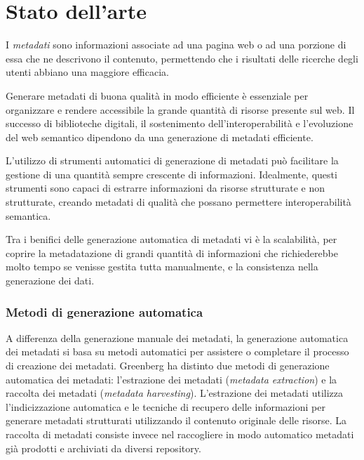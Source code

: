 \clearpage{\pagestyle{empty}\cleardoublepage}
\lhead[\fancyplain{}{\bfseries\thepage}]{\fancyplain{}{\bfseries\rightmark}}
\chapter{Stato dell'arte}

I \textit{metadati} sono informazioni associate ad una pagina web o ad una porzione di essa che ne descrivono il contenuto, permettendo che i risultati delle ricerche degli utenti abbiano una maggiore efficacia.

Generare metadati di buona qualità in modo efficiente è essenziale per organizzare e rendere accessibile la grande quantità di risorse presente sul web. Il successo di biblioteche digitali, il sostenimento dell'interoperabilità e l'evoluzione del web semantico dipendono da una generazione di metadati efficiente\cite{metadata}.

\vspace{5mm}

L'utilizzo di strumenti automatici di generazione di metadati può facilitare la gestione di una quantità sempre crescente di informazioni.
Idealmente, questi strumenti sono capaci di estrarre informazioni da risorse strutturate e non strutturate, creando metadati di qualità che possano permettere interoperabilità semantica.

\vspace{5mm}

Tra i benifici delle generazione automatica di metadati vi è la scalabilità, per coprire la metadatazione di grandi quantità di informazioni che richiederebbe molto tempo se venisse gestita tutta manualmente, e la consistenza nella generazione dei dati.

\subsection{Metodi di generazione automatica}

A differenza della generazione manuale dei metadati, la generazione automatica dei metadati si basa su metodi automatici per assistere o completare il processo di creazione dei metadati. Greenberg ha distinto due metodi di generazione automatica dei metadati: l'estrazione dei metadati (\textit{metadata extraction}) e la raccolta dei metadati (\textit{metadata harvesting}).
L'estrazione dei metadati utilizza l'indicizzazione automatica e le tecniche di recupero delle informazioni per generare metadati strutturati utilizzando il contenuto originale delle risorse. La raccolta di metadati consiste invece nel raccogliere in modo automatico metadati già prodotti e archiviati da diversi repository.

